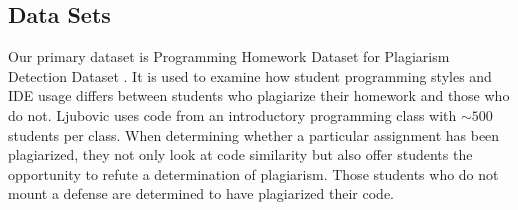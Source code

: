 \documentclass[twocolumn]{article}
\begin{document}
\subsection{\normalsize Data Sets}

Our primary dataset is Programming Homework Dataset for Plagiarism Detection
Dataset \cite{ljubovic}. It is used to examine how student programming styles and IDE usage differs between students who plagiarize their homework and those who do not. Ljubovic uses code from an introductory programming class with $\sim500$ students per class. When determining whether a particular assignment has been plagiarized, they not only look at code similarity but also offer students the opportunity to refute a determination of plagiarism. Those students who do not mount a defense are determined to have plagiarized their code.

\end{document}
